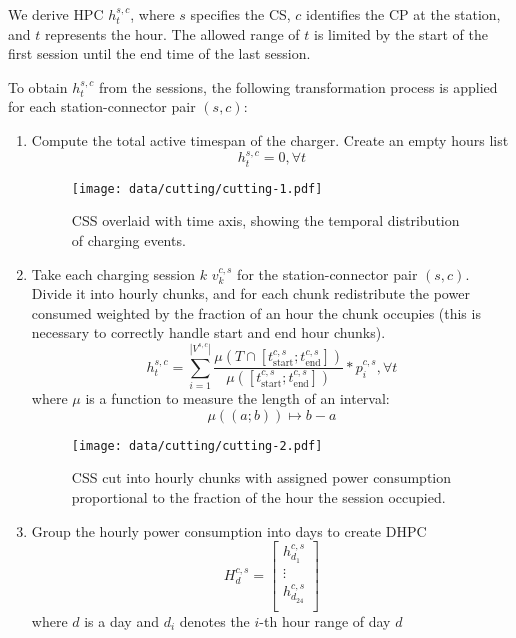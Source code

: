 We derive \acrlong{HPC} $h^{s,c}_t$, where $s$ specifies the \acrlong{CS}, $c$ identifies the \acrlong{CP} at the station, and $t$ represents the hour. The allowed range of $t$ is limited by the start of the first session until the end time of the last session.

To obtain $h^{s,c}_t$ from the sessions, the following transformation process is applied for each station-connector pair $(s,c)$:

\begin{enumerate}
    \item Compute the total active timespan of the charger. Create an empty hours list \[h^{s,c}_t = 0, \forall t\]
          \begin{figure}[H]
              \texttt{[image: data/cutting/cutting-1.pdf]}
              \caption{\acrlong{CSS} overlaid with time axis, showing the temporal distribution of charging events.}
          \end{figure}
    \item Take each charging session $k$ $v^{c,s}_k$ for the station-connector pair $(s,c)$. Divide it into hourly chunks, and for each chunk redistribute the power consumed weighted by the fraction of an hour the chunk occupies (this is necessary to correctly handle start and end hour chunks).
          \[
              h_t^{s,c} = \sum_{i = 1}^{|V^{s,c}|}
              \frac{
                  \mu(T \cap [t_{\text{start}}^{c,s}; t_{\text{end}}^{c,s}])
              }{
                  \mu([t_{\text{start}}^{c,s}; t_{\text{end}}^{c,s}])
              }
              *
              p_i^{c,s}, \forall t
          \]
          where $\mu$ is a function to measure the length of an interval: \[\mu((a;b)) \mapsto b - a\]
          \begin{figure}[H]
              \texttt{[image: data/cutting/cutting-2.pdf]}
              \caption{\acrlong{CSS} cut into hourly chunks with assigned power consumption proportional to the fraction of the hour the session occupied.}
          \end{figure}
    \item Group the hourly power consumption into days to create \acrlong{DHPC}
          \[H_d^{c,s} =
              \begin{bmatrix}
                  h^{c,s}_{d_1}    \\
                  \vdots           \\
                  h^{c,s}_{d_{24}} \\
              \end{bmatrix}
          \] where $d$ is a day and $d_i$ denotes the $i$-th hour range of day $d$
\end{enumerate}


